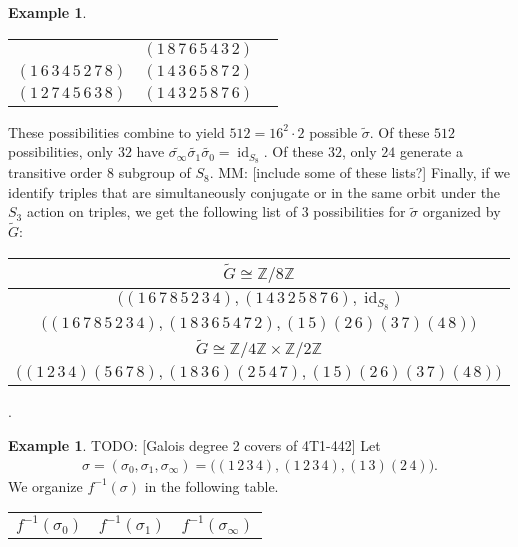 \documentclass[oneside, reqno, 12pt]{amsart}
\theoremstyle{definition}
\newtheorem{example} [thm] {Example}
\theoremstyle{remark}
\newcommand{\Z}{\mathbb Z}
\newcommand{\wt}{\widetilde}
\DeclareMathOperator{\id}{id}
\newcommand{\mm}[1]{{\color{blue} \sf MM: [#1]}}
\newcommand{\todo}[1]{{\color{red} \sf TODO: [#1]}}
\begin{document}
{{\begin{example}
\begin{center}
\begin{tabular}{ccc}
          & $(1\,8\,7\,6\,5\,4\,3\,2)$ &\\
          $(1\,6\,3\,4\,5\,2\,7\,8)$
          & $(1\,4\,3\,6\,5\,8\,7\,2)$ &\\
          $(1\,2\,7\,4\,5\,6\,3\,8)$
          & $(1\,4\,3\,2\,5\,8\,7\,6)$ &\\
          \bottomrule
        \end{tabular}
      \end{center}
      These possibilities combine to yield $512=16^2\cdot 2$
      possible $\wt{\sigma}$.
      Of these $512$ possibilities,
      only $32$ have $\wt{\sigma_\infty}\wt{\sigma_1}\wt{\sigma_0} = \id_{S_8}$.
      Of these $32$,
      only $24$ generate a transitive order $8$
      subgroup of $S_8$.
      \mm{include some of these lists?}
      Finally,
      if we identify triples that are simultaneously conjugate
      or in the same orbit under the $S_3$ action on triples,
      we get the following list of $3$ possibilities for $\wt{\sigma}$
      organized by $\wt{G}$:
      \begin{center}
        \begin{tabular}{c}
          \toprule
          $\wt{G}\cong\Z/8\Z$ \\
          \midrule
          $\Big( (1\,6\,7\,8\,5\,2\,3\,4), (1\,4\,3\,2\,5\,8\,7\,6), \id_{S_8}\Big)$\\
          $\Big( (1\,6\,7\,8\,5\,2\,3\,4), (1\,8\,3\,6\,5\,4\,7\,2), (1\,5)(2\,6)(3\,7)(4\,8)\Big)$\\
          \toprule
          $\wt{G}\cong\Z/4\Z\times\Z/2\Z$\\
          \midrule
          $\Big( (1\,2\,3\,4)(5\,6\,7\,8), (1\,8\,3\,6)(2\,5\,4\,7), (1\,5)(2\,6)(3\,7)(4\,8)\Big)$\\
          \bottomrule
        \end{tabular}.
      \end{center}
    \end{example}
    \begin{example}
      \todo{Galois degree 2 covers of 4T1-442}
      Let
      \begin{align*}
        \sigma = (\sigma_0,\sigma_1,\sigma_\infty)
        = \Big( (1\,2\,3\,4), (1\,2\,3\,4), (1\,3)(2\,4) \Big).
      \end{align*}
      We organize $f^{-1}(\sigma)$ in the following table.
      \begin{center}
        \begin{tabular}{ccc}
          \toprule
          $f^{-1}(\sigma_0)$ & $f^{-1}(\sigma_1)$ & $f^{-1}(\sigma_\infty)$\\

\end{tabular}
\end{center}
\end{example}}}
\end{document}
